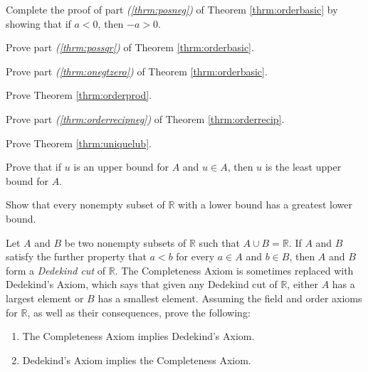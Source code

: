 \begin{exercise}
Complete the proof of part {\itshape(\ref{thrm:posneg})} of Theorem
\ref{thrm:orderbasic} by showing that if $a<0$, then $-a>0$.
\end{exercise}

\begin{exercise}
Prove part {\itshape(\ref{thrm:possqr})} of Theorem \ref{thrm:orderbasic}.
\end{exercise}

\begin{exercise}
Prove part {\itshape(\ref{thrm:onegtzero})} of Theorem \ref{thrm:orderbasic}.
\end{exercise}

\begin{exercise}
Prove Theorem \ref{thrm:orderprod}.
\end{exercise}

\begin{exercise}
Prove part {\itshape(\ref{thrm:orderrecipneg})} of Theorem \ref{thrm:orderrecip}.
\end{exercise}

\begin{exercise}\label{exer:uniqueLUB}
Prove Theorem \ref{thrm:uniquelub}.
\end{exercise}

\begin{exercise}
Prove that if $u$ is an upper bound for $A$ and $u\in A$, then $u$ is the least upper bound for $A$.
\end{exercise}

\begin{exercise}
Show that every nonempty subset of $\mathbb R$ with a lower bound has a greatest lower bound.
\end{exercise}

\begin{exercise}
Let $A$ and $B$ be two nonempty subsets of $\mathbb R$ such that $A\cup B=\mathbb R$. If $A$ and $B$ satisfy the further property that $a<b$ for every $a\in A$ and $b\in B$, then $A$ and $B$ form a \emph{Dedekind cut} of $\mathbb R$. The Completeness Axiom is sometimes replaced with Dedekind's Axiom, which says that given any Dedekind cut of $\mathbb R$, either $A$ has a largest element or $B$ has a smallest element.  Assuming the field and order axioms for $\mathbb R$, as well as their consequences, prove the following:
\begin{enumerate}
\item The Completeness Axiom implies Dedekind's Axiom. 
\item Dedekind's Axiom implies the Completeness Axiom.
\end{enumerate}
\end{exercise}

\clearpage
